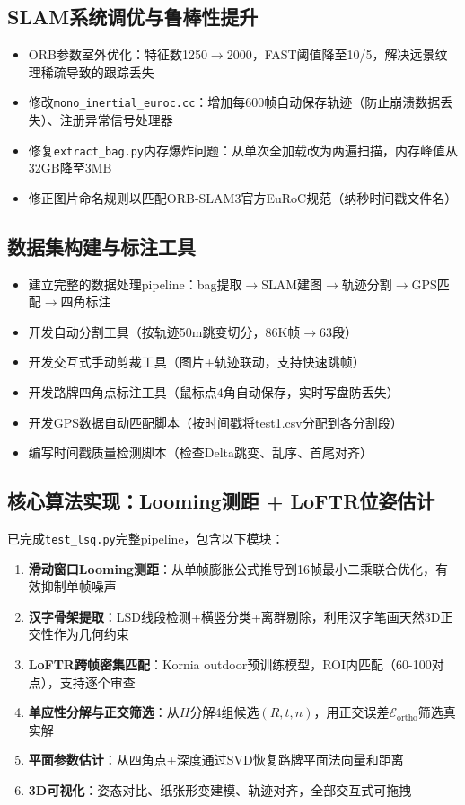\documentclass[12pt,a4paper]{ctexart}
\begin{document}
\subsection{SLAM系统调优与鲁棒性提升}

\begin{itemize}
    \item ORB参数室外优化：特征数1250$\to$2000，FAST阈值降至10/5，解决远景纹理稀疏导致的跟踪丢失
    \item 修改\texttt{mono\_inertial\_euroc.cc}：增加每600帧自动保存轨迹（防止崩溃数据丢失）、注册异常信号处理器
    \item 修复\texttt{extract\_bag.py}内存爆炸问题：从单次全加载改为两遍扫描，内存峰值从32GB降至3MB
    \item 修正图片命名规则以匹配ORB-SLAM3官方EuRoC规范（纳秒时间戳文件名）
\end{itemize}

\subsection{数据集构建与标注工具}

\begin{itemize}
    \item 建立完整的数据处理pipeline：bag提取$\to$SLAM建图$\to$轨迹分割$\to$GPS匹配$\to$四角标注
    \item 开发自动分割工具（按轨迹50m跳变切分，86K帧$\to$63段）
    \item 开发交互式手动剪裁工具（图片+轨迹联动，支持快速跳帧）
    \item 开发路牌四角点标注工具（鼠标点4角自动保存，实时写盘防丢失）
    \item 开发GPS数据自动匹配脚本（按时间戳将test1.csv分配到各分割段）
    \item 编写时间戳质量检测脚本（检查Delta跳变、乱序、首尾对齐）
\end{itemize}

\subsection{核心算法实现：Looming测距 + LoFTR位姿估计}

已完成\texttt{test\_lsq.py}完整pipeline，包含以下模块：

\begin{enumerate}
    \item \textbf{滑动窗口Looming测距}：从单帧膨胀公式推导到16帧最小二乘联合优化，有效抑制单帧噪声
    \item \textbf{汉字骨架提取}：LSD线段检测+横竖分类+离群剔除，利用汉字笔画天然3D正交性作为几何约束
    \item \textbf{LoFTR跨帧密集匹配}：Kornia outdoor预训练模型，ROI内匹配（60-100对点），支持逐个审查
    \item \textbf{单应性分解与正交筛选}：从$H$分解4组候选$(R,t,n)$，用正交误差$\mathcal{E}_{\text{ortho}}$筛选真实解
    \item \textbf{平面参数估计}：从四角点+深度通过SVD恢复路牌平面法向量和距离
    \item \textbf{3D可视化}：姿态对比、纸张形变建模、轨迹对齐，全部交互式可拖拽
\end{enumerate}
\end{document}
